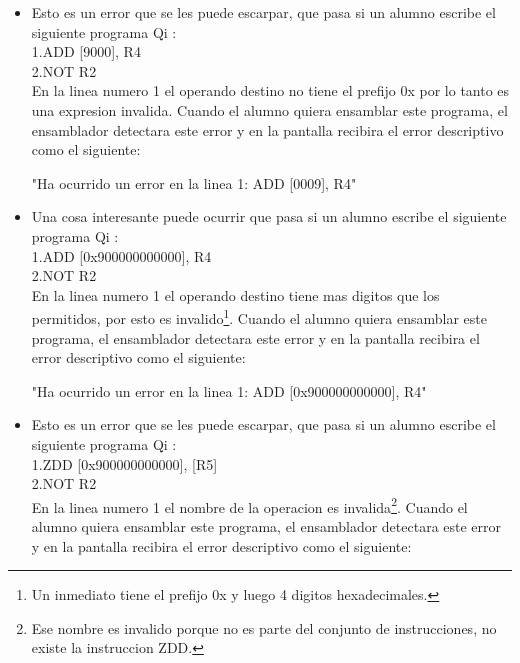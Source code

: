 \begin{itemize}
"Ha ocurrido un error en la linea 2: NOT 0x0004" \\ 

\item Esto es un error que se les puede escarpar, que pasa si un alumno escribe el siguiente programa Qi :\\

1.ADD [9000], R4 \\
2.NOT R2 \\

En la linea numero 1 el operando destino no tiene el prefijo 0x por lo tanto es una expresion invalida. Cuando el alumno quiera ensamblar este programa, el ensamblador detectara este error y en la pantalla recibira el error descriptivo como el siguiente:

"Ha ocurrido un error en la linea 1: ADD [0009], R4" \\ 

\item Una cosa interesante puede ocurrir que pasa si un alumno escribe el siguiente programa Qi :\\

1.ADD [0x900000000000], R4 \\
2.NOT R2 \\

En la linea numero 1 el operando destino tiene mas digitos que los permitidos, por esto es invalido\footnote{Un inmediato tiene el prefijo 0x y luego 4 digitos hexadecimales.}. Cuando el alumno quiera ensamblar este programa, el ensamblador detectara este error y en la pantalla recibira el error descriptivo como el siguiente:

"Ha ocurrido un error en la linea 1: ADD [0x900000000000], R4" \\ 

\item Esto es un error que se les puede escarpar, que pasa si un alumno escribe el siguiente programa Qi  :\\

1.ZDD [0x900000000000], [R5] \\
2.NOT R2 \\

En la linea numero 1 el nombre de la operacion es invalida\footnote{Ese nombre es invalido porque no es parte del conjunto de instrucciones, no existe la instruccion ZDD.}. Cuando el alumno quiera ensamblar este programa, el ensamblador detectara este error y en la pantalla recibira el error descriptivo como el siguiente:


\end{itemize}
